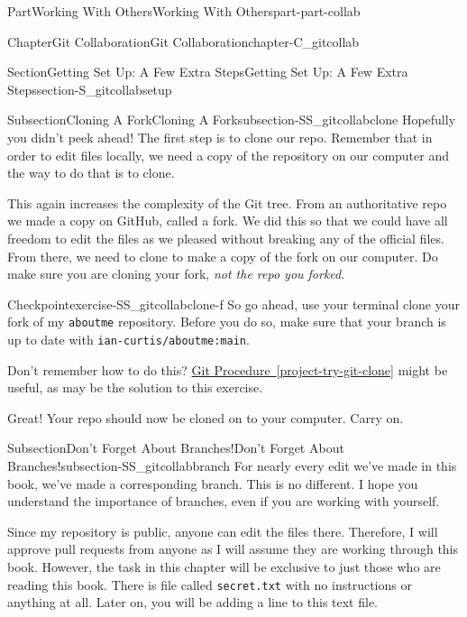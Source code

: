\documentclass[oneside,10pt,]{book}
\newcommand{\xreffont}{\relax}
\newcommand{\mono}[1]{\texttt{#1}}
\begin{document}
\begin{partptx}{Part}{Working With Others}{}{Working With Others}{}{}{part-part-collab}
\begin{chapterptx}{Chapter}{Git Collaboration}{}{Git Collaboration}{}{}{chapter-C_gitcollab}
\begin{sectionptx}{Section}{Getting Set Up: A Few Extra Steps}{}{Getting Set Up: A Few Extra Steps}{}{}{section-S_gitcollabsetup}
\begin{introduction}{}
\end{introduction}%
%
%
\typeout{************************************************}
\typeout{************************************************}
%
\begin{subsectionptx}{Subsection}{Cloning A Fork}{}{Cloning A Fork}{}{}{subsection-SS_gitcollabclone}
%
%
Hopefully you didn't peek ahead! The first step is to clone our repo. Remember that in order to edit files locally, we need a copy of the repository on our computer and the way to do that is to clone.%
\par
This again increases the complexity of the Git tree. From an authoritative repo we made a copy on GitHub, called a fork. We did this so that we could have all freedom to edit the files as we pleased without breaking any of the official files. From there, we need to clone to make a copy of the fork on our computer. Do make sure you are cloning your fork, \emph{not the repo you forked}.%
\begin{inlineexercise}{Checkpoint}{}{exercise-SS_gitcollabclone-f}%
So go ahead, use your terminal clone your fork of my \mono{aboutme} repository. Before you do so, make sure that your branch is up to date with \mono{ian-curtis/aboutme:main}.%
\par
Don't remember how to do this? \hyperref[project-try-git-clone]{Git Procedure~{\xreffont\ref{project-try-git-clone}}} might be useful, as may be the solution to this exercise.%
\end{inlineexercise}%
Great! Your repo should now be cloned on to your computer. Carry on.%
\end{subsectionptx}
%
%
\typeout{************************************************}
\typeout{************************************************}
%
\begin{subsectionptx}{Subsection}{Don't Forget About Branches!}{}{Don't Forget About Branches!}{}{}{subsection-SS_gitcollabbranch}
%
%
For nearly every edit we've made in this book, we've made a corresponding branch. This is no different. I hope you understand the importance of branches, even if you are working with yourself.%
\par
Since my repository is public, anyone can edit the files there. Therefore, I will approve pull requests from anyone as I will assume they are working through this book. However, the task in this chapter will be exclusive to just those who are reading this book. There is file called \mono{secret.txt} with no instructions or anything at all. Later on, you will be adding a line to this text file.%

\end{subsectionptx}
\end{sectionptx}
\end{chapterptx}
\end{partptx}
\end{document}
